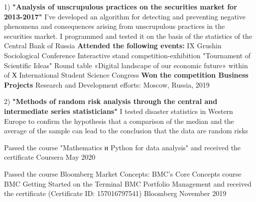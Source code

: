\documentclass[]{awesome-cv}
\begin{document}
\vspace{-9mm}
\begin{cventries}
	\cventry
	{1) \textbf{"Analysis of unscrupulous practices on the securities market for 2013-2017"}
	\newline \qquad \bullet  I’ve developed an algorithm for detecting and preventing negative phenomena and consequences arising from unscrupulous practices in the securities market. I programmed and tested it on the basis of the statistics of the Central Bank of Russia
	\newline 
	\textbf{Attended the following events:}
	\newline \quad IX Grushin Sociological Conference   
	\newline \quad Interactive stand competition-exhibition "Tournament of Scientific Ideas"  
	\newline \quad Round table «Digital landscape of our economic future» within of Х International Student
	\newline \quad Science Congress
	\newline \textbf{Won the competition Business Projects} } 
	{Research and Development efforts:}
	{Moscow, Russia, 2019}
	{}
	{}
		\end{cventries}  \vspace{-6mm} \begin{cventries}
	\cventry
	{2) \textbf{"Methods of random risk analysis through the central and intermediate series statisticians"}
	\newline \qquad \bullet I tested disaster statistics in Western Europe to confirm the hypothesis that a comparison of the median and the average of the sample can lead to the conclusion that the data are random risks
	}
	{}%
	{}
	{}
	{}
	\vspace{-5mm}
\end{cventries}


\begin{cventries}
	\cventry
		{}
	{Passed the course "Mathematics и Python for data analysis" and received the certificate }
	{Coursera
	\newline May 2020}
	{}
	{}
	\end{cventries} \vspace{-6mm} \begin{cventries}
	
	\cventry
		{}
	{Passed the course Bloomberg Market Concepts:
	\newline \quad \bullet BMC's Core Concepts course
	\newline \quad \bullet BMC Getting Started on the Terminal
	\newline \quad \bullet BMC Portfolio Management
	\newline \quad and received the certificate (Certificate ID: 157016797541)}
	{Bloomberg
	\newline November 2019}
	{}
	{}
	\end{cventries} 
	\vspace{-7mm}
	
\end{document}
